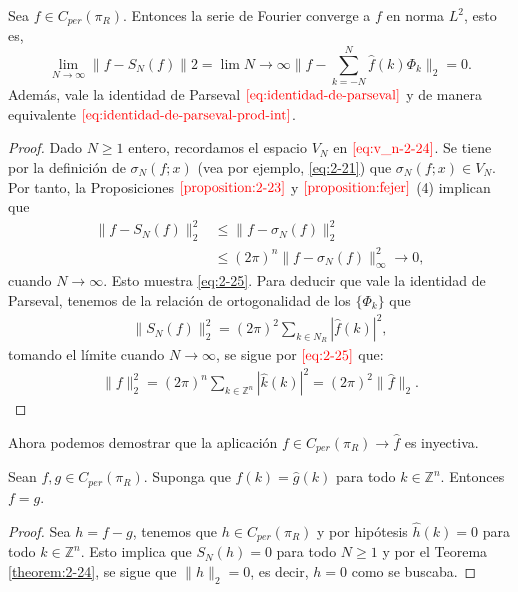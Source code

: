     \begin{theorem}\label{theorem:2-24}
      Sea $f \in C_{per}(\pi_R)$. Entonces la serie de Fourier converge a $f$ en norma $L^2$, esto es,
      \begin{equation}
        \lim_{N \to \infty} \|f - S_N(f)\|2 = \lim{N \to \infty} \|f - \sum_{k=-N}^{N} \hat{f}(k) \Phi_k\|_2 = 0.\label{eq:2-25}
      \end{equation}
      Además, vale la identidad de Parseval $\textcolor{red}{\ref{eq:identidad-de-parseval}}$ y de manera equivalente $\textcolor{red}{\ref{eq:identidad-de-parseval-prod-int}}$.
    \end{theorem}
    \begin{proof}
      Dado $N\geq 1$ entero, recordamos el espacio $V_N$ en $\textcolor{red}{\ref{eq:v_n-2-24}}$. Se tiene por la definición de $\sigma_N(f;x)$ (vea por ejemplo, \textcolor{red}{\ref{eq:2-21}}) que $\sigma_N(f;x)\in V_N$. Por tanto, la Proposiciones $\textcolor{red}{\ref{proposition:2-23}}$ y $\textcolor{red}{\ref{proposition:fejer}}$ (4) implican que
      \begin{align*}
        \|f-S_N(f)\|_2^2&\leq \|f-\sigma_N(f)\|_2^2\\
        &\leq (2\pi)^n\|f-\sigma_N(f)\|_{\infty}^{2}\to 0,
      \end{align*}
      cuando $N\to \infty$. Esto muestra \textcolor{red}{\ref{eq:2-25}}. Para deducir que vale la identidad de Parseval, tenemos de la relación de ortogonalidad de los $\{\Phi_k\}$ que
      \begin{align*}
        \|S_N(f)\|_{2}^{2}=(2\pi)^2\sum_{k\in N_R}|\hat{f}(k)|^2,
      \end{align*}
      tomando el límite cuando $N\to \infty$, se sigue por $\textcolor{red}{\ref{eq:2-25}}$ que:
      \begin{align*}
        \|f\|_2^2=(2\pi)^{n}\sum_{k\in\mathbb{Z}^{n}}|\hat{k}(k)|^{2}=(2\pi)^{2}\|\hat{f}\|_2.
      \end{align*}
    \end{proof}
    Ahora podemos demostrar que la aplicación $f \in C_{per}(\pi_R)\to \hat{f}$  es inyectiva.
    \begin{corollary}
      Sean $f, g \in C_{per}(\pi_R)$. Suponga que $\hat{f}(k) = \hat{g}(k)$ para todo $k \in \mathbb{Z}^{n}$. Entonces $f = g$.  
    \end{corollary}
    \begin{proof}
      Sea $h = f - g$, tenemos que $h \in C_{per}(\pi_R)$ y por hipótesis $\hat{h}(k) = 0$ para todo $k \in \mathbb{Z}^{n}$. Esto implica que $S_N(h) = 0$ para todo $N \geq 1$ y por el Teorema \textcolor{red}{\ref{theorem:2-24}}, se sigue que $\|h\|_2 = 0$, es decir, $h = 0$ como se buscaba.  
    \end{proof}
